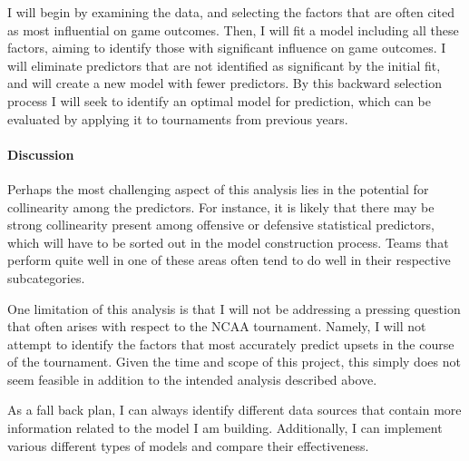\documentclass[12pt]{article}
\begin{document}
I will begin by examining the data, and selecting the factors that are often cited as 
most influential on game outcomes.  Then, I will fit a model including all these 
factors, aiming to identify those with significant influence on game outcomes.  I 
will eliminate predictors that are not identified as significant by the initial fit, 
and will create a new model with fewer predictors.  By this backward selection process 
I will seek to identify an optimal model for prediction, which can be evaluated by 
applying it to tournaments from previous years.  


\paragraph{Discussion}
Perhaps the most challenging aspect of this analysis lies in the potential for 
collinearity among the predictors.  For instance, it is likely that there may be strong 
collinearity present among offensive or defensive statistical predictors, which will 
have to be sorted out in the model construction process.  Teams that perform quite well 
in one of these areas often tend to do well in their respective subcategories.

One limitation of this analysis is that I will not be addressing a pressing question 
that often arises with respect to the NCAA tournament.  Namely, I will not attempt to 
identify the factors that most accurately predict upsets in the course of the tournament.  
Given the time and scope of this project, this simply does not seem feasible in addition 
to the intended analysis described above.  

As a fall back plan, I can always identify different data sources that contain more 
information related to the model I am building.  Additionally, I can implement various 
different types of models and compare their effectiveness. 



\end{document}
